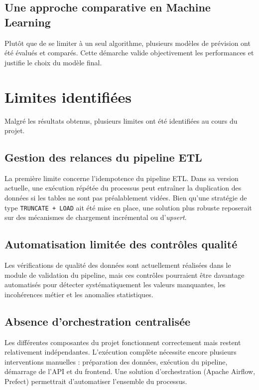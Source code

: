 \documentclass[12pt,a4paper,twoside]{report}
\begin{document}
\subsection{Une approche comparative en Machine Learning}

Plutôt que de se limiter à un seul algorithme, plusieurs modèles de prévision ont été évalués et comparés. Cette démarche valide objectivement les performances et justifie le choix du modèle final.

\section{Limites identifiées}

Malgré les résultats obtenus, plusieurs limites ont été identifiées au cours du projet.

\subsection{Gestion des relances du pipeline ETL}

La première limite concerne l'idempotence du pipeline ETL. Dans sa version actuelle, une exécution répétée du processus peut entraîner la duplication des données si les tables ne sont pas préalablement vidées. Bien qu'une stratégie de type \texttt{TRUNCATE + LOAD} ait été mise en place, une solution plus robuste reposerait sur des mécanismes de chargement incrémental ou d'\textit{upsert}.

\subsection{Automatisation limitée des contrôles qualité}

Les vérifications de qualité des données sont actuellement réalisées dans le module de validation du pipeline, mais ces contrôles pourraient être davantage automatisés pour détecter systématiquement les valeurs manquantes, les incohérences métier et les anomalies statistiques.

\subsection{Absence d'orchestration centralisée}

Les différentes composantes du projet fonctionnent correctement mais restent relativement indépendantes. L'exécution complète nécessite encore plusieurs interventions manuelles : préparation des données, exécution du pipeline, démarrage de l'API et du frontend. Une solution d'orchestration (Apache Airflow, Prefect) permettrait d'automatiser l'ensemble du processus.
\end{document}

